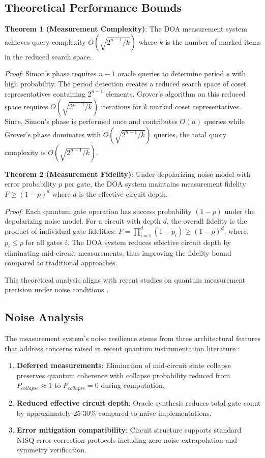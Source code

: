 \documentclass[journal]{IEEEtran}
\begin{document}
\subsection{Theoretical Performance Bounds}

\textbf{Theorem 1 (Measurement Complexity)}: The DOA measurement system achieves query complexity $O(\sqrt{2^{n-1}/k})$ where $k$ is the number of marked items in the reduced search space.

\textit{Proof}: Simon's phase requires $n-1$ oracle queries to determine period $s$ with high probability. The period detection creates a reduced search space of coset representatives containing $2^{n-1}$ elements. Grover's algorithm on this reduced space requires $O(\sqrt{2^{n-1}/k})$ iterations for $k$ marked coset representatives. Since, Simon's phase is performed once and contributes $O(n)$ queries while Grover's phase dominates with $O(\sqrt{2^{n-1}/k})$ queries, the total query complexity is $O(\sqrt{2^{n-1}/k})$.

\textbf{Theorem 2 (Measurement Fidelity)}: Under depolarizing noise model with error probability $p$ per gate, the DOA system maintains measurement fidelity $F \geq (1-p)^d$ where $d$ is the effective circuit depth.

\textit{Proof}: Each quantum gate operation has success probability $(1-p)$ under the depolarizing noise model. For a circuit with depth $d$, the overall fidelity is the product of individual gate fidelities: $F = \prod_{i=1}^{d} (1-p_i) \geq (1-p)^d$, where, $p_i \leq p$ for all gates $i$. The DOA system reduces effective circuit depth by eliminating mid-circuit measurements, thus improving the fidelity bound compared to traditional approaches.

This theoretical analysis aligns with recent studies on quantum measurement precision under noise conditions \cite{Bharti_2022, 9142431}.

\subsection{Noise Analysis}

The measurement system's noise resilience stems from three architectural features that address concerns raised in recent quantum instrumentation literature \cite{9142431, 10041809}:

\begin{enumerate}
\item \textbf{Deferred measurements}: Elimination of mid-circuit state collapse preserves quantum coherence with collapse probability reduced from $P_{collapse} \approx 1$ to $P_{collapse} = 0$ during computation.
\item \textbf{Reduced effective circuit depth}: Oracle synthesis reduces total gate count by approximately 25-30\% compared to naive implementations.
\item \textbf{Error mitigation compatibility}: Circuit structure supports standard NISQ error correction protocols including zero-noise extrapolation and symmetry verification.
\end{enumerate}
\end{document}
